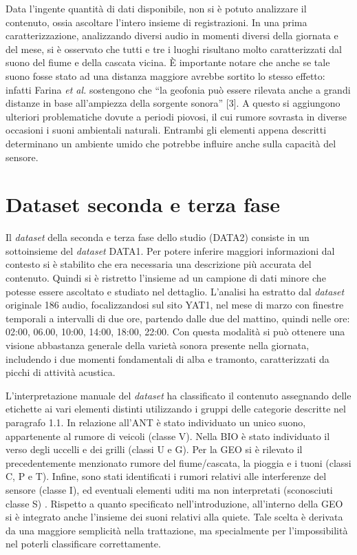 Data l’ingente quantità di dati disponibile, non si è potuto analizzare il contenuto, ossia
ascoltare l’intero insieme di registrazioni. In una prima caratterizzazione, analizzando diversi
audio in momenti diversi della giornata e del mese, si è osservato che tutti e tre i luoghi 
risultano molto caratterizzati dal suono del fiume e della cascata vicina. È importante notare
che anche se tale suono fosse stato ad una distanza maggiore avrebbe sortito lo stesso effetto:
infatti Farina \textit{et al.} sostengono che “la geofonia può essere rilevata anche a grandi distanze in
base all’ampiezza della sorgente sonora” [3]. A questo si aggiungono ulteriori problematiche
dovute a periodi piovosi, il cui rumore sovrasta in diverse occasioni i suoni ambientali
naturali. Entrambi gli elementi appena descritti determinano un ambiente umido che potrebbe
influire anche sulla capacità del sensore.


\section{Dataset seconda e terza fase}
Il \textit{dataset} della seconda e terza fase dello studio (DATA2) consiste in un sottoinsieme del
\textit{dataset} DATA1. Per potere inferire maggiori informazioni dal contesto si è stabilito che era
necessaria una descrizione più accurata del contenuto. Quindi si è ristretto l’insieme ad un
campione di dati minore che potesse essere ascoltato e studiato nel dettaglio. L’analisi ha
estratto dal \textit{dataset} originale 186 audio, focalizzandosi sul sito YAT1, nel mese di marzo con
finestre temporali a intervalli di due ore, partendo dalle due del mattino, quindi nelle ore:
02:00, 06.00, 10:00, 14:00, 18:00, 22:00. Con questa modalità si può ottenere una visione
abbastanza generale della varietà sonora presente nella giornata, includendo i due momenti
fondamentali di alba e tramonto, caratterizzati da picchi di attività acustica.

L’interpretazione manuale del \textit{dataset} ha classificato il contenuto assegnando delle etichette
ai vari elementi distinti utilizzando i gruppi delle categorie descritte nel paragrafo 1.1. In relazione
all’ANT è stato individuato un unico suono, appartenente al rumore di veicoli (classe V).
Nella BIO è stato individuato il verso degli uccelli e dei grilli (classi U e G). Per la GEO si è
rilevato il precedentemente menzionato rumore del fiume/cascata, la pioggia e i tuoni (classi
C, P e T). Infine, sono stati identificati i rumori relativi alle interferenze del sensore (classe I),
ed eventuali elementi uditi ma non interpretati (sconosciuti classe S) . Rispetto a quanto
specificato nell’introduzione, all’interno della GEO si è integrato anche l’insieme dei suoni
relativi alla quiete. Tale scelta è derivata da una maggiore semplicità nella trattazione, ma
specialmente per l'impossibilità nel poterli classificare correttamente.

